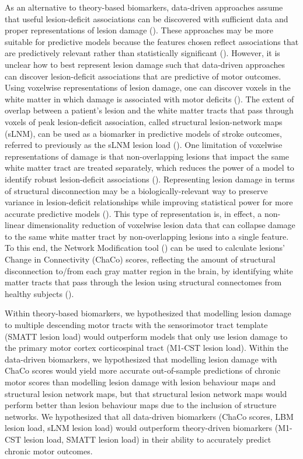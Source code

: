 \documentclass[10pt]{article}
\begin{document}
As an alternative to theory-based biomarkers, data-driven approaches assume that useful lesion-deficit associations can be discovered with sufficient data and proper representations of lesion damage (\cite{Kasties2021-rm, Bourached2022-vz, }). These approaches may be more suitable for predictive models because the features chosen reflect associations that are predictively relevant rather than statistically significant (\cite{Bzdok2020-py}). However, it is unclear how to best represent lesion damage such that data-driven approaches can discover lesion-deficit associations that are predictive of motor outcomes. Using voxelwise representations of lesion damage, one can discover voxels in the white matter in which damage is associated with motor deficits (\cite{Bowren2022-rs}). The extent of overlap between a patient's lesion and the white matter tracts that pass through voxels of peak lesion-deficit association, called structural lesion-network maps (sLNM), can be used as a biomarker in predictive models of stroke outcomes, referred to previously as the sLNM lesion load (\cite{Bowren2022-rs}). One limitation of voxelwise representations of damage is that non-overlapping lesions that impact the same white matter tract are treated separately, which reduces the power of a model to identify robust lesion-deficit associations (\cite{Sperber2022-oj}). Representing lesion damage in terms of structural disconnection may be a biologically-relevant way to preserve variance in lesion-deficit relationships while improving statistical power for more accurate predictive models (\cite{Sperber2022-oj}). This type of representation is, in effect, a non-linear dimensionality reduction of voxelwise lesion data that can collapse damage to the same white matter tract by non-overlapping lesions into a single feature. To this end, the Network Modification tool (\cite{Kuceyeski2013-nk}) can be used to calculate lesions' Change in Connectivity (ChaCo) scores, reflecting the amount of structural disconnection to/from each gray matter region in the brain, by identifying white matter tracts that pass through the lesion using structural connectomes from healthy subjects (\cite{Kuceyeski2013-nk, Kuceyeski2016-vj, Salvalaggio2020-pe, Griffis2019-cy, Sperber2022-oj}).
 
Within theory-based biomarkers, we hypothesized that modelling lesion damage to multiple descending motor tracts with the sensorimotor tract template (SMATT lesion load) would outperform models that only use lesion damage to the primary motor cortex corticospinal tract (M1-CST lesion load). Within the data-driven biomarkers, we hypothesized that modelling lesion damage with ChaCo scores would yield more accurate out-of-sample predictions of chronic motor scores than modelling lesion damage with lesion behaviour maps and structural lesion network maps, but that structural lesion network maps would perform better than lesion behaviour maps due to the inclusion of structure networks. We hypothesized that all data-driven biomarkers (ChaCo scores, LBM lesion load, sLNM lesion load) would outperform theory-driven biomarkers (M1-CST lesion load, SMATT lesion load) in their ability to accurately predict chronic motor outcomes. 
\end{document}
